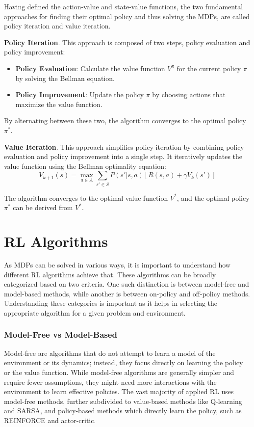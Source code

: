 Having defined the action-value and state-value functions, the two fundamental approaches for finding their optimal policy and thus solving the MDPs, are called policy iteration and value iteration.

\textbf{Policy Iteration}. This approach is composed of two steps, policy evaluation and policy improvement:
\begin{itemize}
    \item \textbf{Policy Evaluation}: Calculate the value function $V^{\pi}$ for the current policy $\pi$ by solving the Bellman equation.
    \item \textbf{Policy Improvement}: Update the policy $\pi$ by choosing actions that maximize the value function.
\end{itemize}

By alternating between these two, the algorithm converges to the optimal policy $\pi^*$.

\textbf{Value Iteration}. This approach simplifies policy iteration by combining policy evaluation and policy improvement into a single step.
It iteratively updates the value function using the Bellman optimality equation:
\[
V_{k+1}(s) = \max_{a \in A} \sum_{s' \in S} P(s'|s,a) \left[ R(s,a) + \gamma V_k(s') \right]
\]

The algorithm converges to the optimal value function $V^*$, and the optimal policy $\pi^*$ can be derived from $V^*$.


\section{RL Algorithms}

As \gls{MDP}s can be solved in various ways, it is important to understand how different \gls{RL} algorithms achieve that.
These algorithms can be broadly categorized based on two criteria.
One such distinction is between model-free and model-based methods, while another is between on-policy and off-policy methods.
Understanding these categories is important as it helps in selecting the appropriate algorithm for a given problem and environment.

\subsubsection{Model-Free vs Model-Based}

Model-free are algorithms that do not attempt to learn a model of the environment or its dynamics; instead, they focus directly on learning the policy or the value function.
While model-free algorithms are generally simpler and require fewer assumptions, they might need more interactions with the environment to learn effective policies.
The vast majority of applied RL uses model-free methods, further subdivided to value-based methods like Q-learning and SARSA, and policy-based methods which directly learn the policy, such as REINFORCE and actor-critic.

